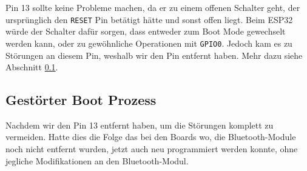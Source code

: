Pin 13 sollte keine Probleme machen, da er zu einem offenen Schalter geht,
der ursprünglich den \texttt{RESET} Pin betätigt hätte und sonst offen liegt. 
Beim ESP32 würde der Schalter dafür sorgen, 
dass entweder zum Boot Mode gewechselt werden kann, 
oder zu gewöhnliche Operationen mit \texttt{GPIO0}. 
Jedoch kam es zu Störungen an diesem Pin, 
weshalb wir den Pin entfernt haben. 
Mehr dazu siehe Abschnitt \ref{subsec:gestoert_boot}.


\subsection{Gestörter Boot Prozess}
\label{subsec:gestoert_boot}
Nachdem wir den Pin 13 entfernt haben, 
um die Störungen komplett zu vermeiden. 
% 
Hatte dies die Folge das bei den Boards wo, 
die Bluetooth-Module noch nicht entfernt wurden,
jetzt auch neu programmiert werden konnte,
ohne jegliche Modifikationen an den Bluetooth-Modul.
